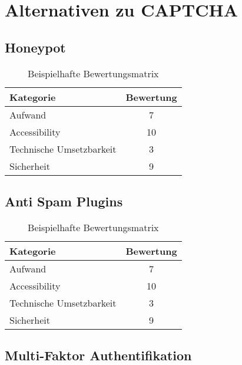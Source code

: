 \section{Alternativen zu CAPTCHA}

\subsection{Honeypot}

\begin{table}[h!]
    \caption{Beispielhafte Bewertungsmatrix}
    \begin{center}
        \begin{tabular}{l|c}
            Kategorie                       & Bewertung \\\hline
            Aufwand                         & 7         \\
            Accessibility                   & 10        \\
            Technische Umsetzbarkeit        & 3         \\
            Sicherheit                      & 9         
        \end{tabular}
    \end{center}
\end{table}

\subsection{Anti Spam Plugins}

\begin{table}[h!]
    \caption{Beispielhafte Bewertungsmatrix}
    \begin{center}
        \begin{tabular}{l|c}
            Kategorie                       & Bewertung \\\hline
            Aufwand                         & 7         \\
            Accessibility                   & 10        \\
            Technische Umsetzbarkeit        & 3         \\
            Sicherheit                      & 9         
        \end{tabular}
    \end{center}
\end{table}

\subsection{Multi-Faktor Authentifikation}

